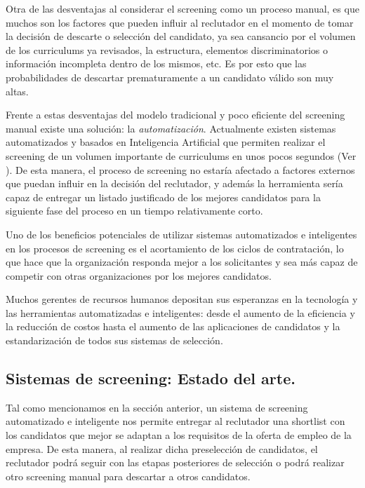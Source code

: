 \documentclass[12pt,a4paper]{article}
\begin{document}
\begin{sloppypar}
Otra de las desventajas al considerar el screening como un proceso manual, es que muchos son los factores que pueden influir al reclutador en el momento de tomar la decisión de descarte o selección del candidato, ya sea cansancio por el volumen de los curriculums ya revisados, la estructura, elementos discriminatorios o información incompleta dentro de los mismos, etc. Es por esto que las probabilidades de descartar prematuramente a un candidato válido son muy altas.

Frente a estas desventajas del modelo tradicional y poco eficiente del screening manual existe una solución: la \textit{automatización}. Actualmente existen sistemas automatizados y basados en Inteligencia Artificial que permiten realizar el screening de un volumen importante de curriculums en unos pocos segundos (Ver \textit{}). De esta manera, el proceso de screening no estaría afectado a factores externos que puedan influir en la decisión del reclutador, y además la herramienta sería capaz de entregar un listado justificado de los mejores candidatos para la siguiente fase del proceso en un tiempo relativamente corto.

\cleardoublepage    %

Uno de los beneficios potenciales de utilizar sistemas automatizados e inteligentes en los procesos de screening es el acortamiento de los ciclos de contratación, lo que hace que la organización responda mejor a los solicitantes y sea más capaz de competir con otras organizaciones por los mejores candidatos\cite{seleccion_reclutamiento_1}.  

Muchos gerentes de recursos humanos depositan sus esperanzas en la tecnología y las herramientas automatizadas e inteligentes: desde el aumento de la eficiencia y la reducción de costos hasta el aumento de las aplicaciones de candidatos y la estandarización de todos sus sistemas de selección\cite{seleccion_reclutamiento_1}.

\subsection{Sistemas de screening: Estado del arte.}\label{Estado_del_arte}

Tal como mencionamos en la sección anterior, un sistema de screening automatizado e inteligente nos permite entregar al reclutador una shortlist con los candidatos que mejor se adaptan a los requisitos de la oferta de empleo de la empresa. De esta manera, al realizar dicha preselección de candidatos, el reclutador podrá seguir con las etapas posteriores de selección o podrá realizar otro screening manual para descartar a otros candidatos.


\end{sloppypar}
\end{document}
